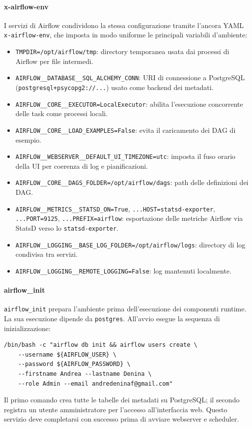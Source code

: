 \paragraph{x-airflow-env}
I servizi di Airflow condividono la stessa configurazione tramite l’ancora YAML \texttt{x-airflow-env}, che imposta in modo uniforme le principali variabili d’ambiente:
\begin{itemize}
  \item \texttt{TMPDIR=/opt/airflow/tmp}: directory temporanea usata dai processi di Airflow per file intermedi.
  \item \texttt{AIRFLOW\_\_DATABASE\_\_SQL\_ALCHEMY\_CONN}: URI di connessione a PostgreSQL (\texttt{postgresql+psycopg2://...}) usato come backend dei metadati.
  \item \texttt{AIRFLOW\_\_CORE\_\_EXECUTOR=LocalExecutor}: abilita l’esecuzione concorrente delle task come processi locali.
  \item \texttt{AIRFLOW\_\_CORE\_\_LOAD\_EXAMPLES=False}: evita il caricamento dei DAG di esempio.
  \item \texttt{AIRFLOW\_\_WEBSERVER\_\_DEFAULT\_UI\_TIMEZONE=utc}: imposta il fuso orario della UI per coerenza di log e pianificazioni.
  \item \texttt{AIRFLOW\_\_CORE\_\_DAGS\_FOLDER=/opt/airflow/dags}: path delle definizioni dei DAG.
  \item \texttt{AIRFLOW\_\_METRICS\_\_STATSD\_ON=True}, \texttt{...HOST=statsd-exporter}, \texttt{...PORT=9125}, \texttt{...PREFIX=airflow}: esportazione delle metriche Airflow via StatsD verso lo \texttt{statsd-exporter}.
  \item \texttt{AIRFLOW\_\_LOGGING\_\_BASE\_LOG\_FOLDER=/opt/airflow/logs}: directory di log condivisa tra servizi.
  \item \texttt{AIRFLOW\_\_LOGGING\_\_REMOTE\_LOGGING=False}: log mantenuti localmente.
\end{itemize}

\paragraph{airflow\_init}
\texttt{airflow\_init} prepara l’ambiente prima dell’esecuzione dei componenti runtime. La  sua esecuzione dipende da \texttt{postgres}. All’avvio esegue la sequenza di inizializzazione:
\begin{verbatim}
/bin/bash -c "airflow db init && airflow users create \
    --username ${AIRFLOW_USER} \
    --password ${AIRFLOW_PASSWORD} \
    --firstname Andrea --lastname Denina \
    --role Admin --email andredeninaf@gmail.com"
\end{verbatim}
Il primo comando crea tutte le tabelle dei metadati su PostgreSQL; il secondo registra un utente amministratore per l’accesso all’interfaccia web. Questo servizio deve completarsi con successo prima di avviare webserver e scheduler.

